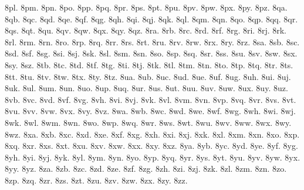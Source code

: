 {8pl.
8pm.
8pn.
8po.
8pp.
8pq.
8pr.
8ps.
8pt.
8pu.
8pv.
8pw.
8px.
8py.
8pz.
8qa.
8qb.
8qc.
8qd.
8qe.
8qf.
8qg.
8qh.
8qi.
8qj.
8qk.
8ql.
8qm.
8qn.
8qo.
8qp.
8qq.
8qr.
8qs.
8qt.
8qu.
8qv.
8qw.
8qx.
8qy.
8qz.
8ra.
8rb.
8rc.
8rd.
8rf.
8rg.
8ri.
8rj.
8rk.
8rl.
8rm.
8rn.
8ro.
8rp.
8rq.
8rr.
8rs.
8rt.
8ru.
8rv.
8rw.
8rx.
8ry.
8rz.
8sa.
8sb.
8sc.
8sd.
8sf.
8sg.
8si.
8sj.
8sk.
8sl.
8sm.
8sn.
8so.
8sp.
8sq.
8sr.
8ss.
8su.
8sv.
8sw.
8sx.
8sy.
8sz.
8tb.
8tc.
8td.
8tf.
8tg.
8ti.
8tj.
8tk.
8tl.
8tm.
8tn.
8to.
8tp.
8tq.
8tr.
8ts.
8tt.
8tu.
8tv.
8tw.
8tx.
8ty.
8tz.
8ua.
8ub.
8uc.
8ud.
8ue.
8uf.
8ug.
8uh.
8ui.
8uj.
8uk.
8ul.
8um.
8un.
8uo.
8up.
8uq.
8ur.
8us.
8ut.
8uu.
8uv.
8uw.
8ux.
8uy.
8uz.
8vb.
8vc.
8vd.
8vf.
8vg.
8vh.
8vi.
8vj.
8vk.
8vl.
8vm.
8vn.
8vp.
8vq.
8vr.
8vs.
8vt.
8vu.
8vv.
8vw.
8vx.
8vy.
8vz.
8wa.
8wb.
8wc.
8wd.
8we.
8wf.
8wg.
8wh.
8wi.
8wj.
8wk.
8wl.
8wm.
8wn.
8wo.
8wp.
8wq.
8wr.
8ws.
8wt.
8wu.
8wv.
8ww.
8wx.
8wy.
8wz.
8xa.
8xb.
8xc.
8xd.
8xe.
8xf.
8xg.
8xh.
8xi.
8xj.
8xk.
8xl.
8xm.
8xn.
8xo.
8xp.
8xq.
8xr.
8xs.
8xt.
8xu.
8xv.
8xw.
8xx.
8xy.
8xz.
8ya.
8yb.
8yc.
8yd.
8ye.
8yf.
8yg.
8yh.
8yi.
8yj.
8yk.
8yl.
8ym.
8yn.
8yo.
8yp.
8yq.
8yr.
8ys.
8yt.
8yu.
8yv.
8yw.
8yx.
8yy.
8yz.
8za.
8zb.
8zc.
8zd.
8ze.
8zf.
8zg.
8zh.
8zi.
8zj.
8zk.
8zl.
8zm.
8zn.
8zo.
8zp.
8zq.
8zr.
8zs.
8zt.
8zu.
8zv.
8zw.
8zx.
8zy.
8zz.
}
